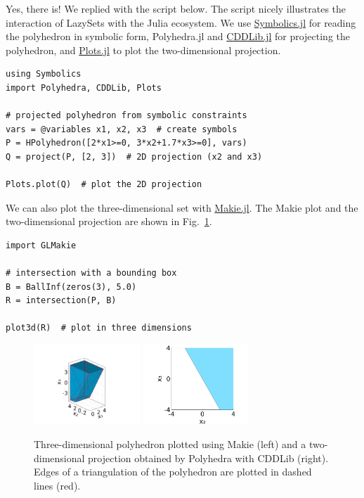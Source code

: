 Yes, there is!
We replied with the script below.
The script nicely illustrates the interaction of LazySets with the Julia ecosystem.
We use \href{https://github.com/JuliaSymbolics/Symbolics.jl}{Symbolics.jl} for reading the polyhedron in symbolic form, Polyhedra.jl and \href{https://github.com/JuliaPolyhedra/CDDLib.jl}{CDDLib.jl} for projecting the polyhedron, and \href{https://github.com/JuliaPlots/Plots.jl}{Plots.jl} to plot the two-dimensional projection.

\begin{minipage}{\linewidth}
\vspace{-\abovedisplayskip}
\begin{lstlisting}
using Symbolics
import Polyhedra, CDDLib, Plots

# projected polyhedron from symbolic constraints
vars = @variables x1, x2, x3  # create symbols
P = HPolyhedron([2*x1>=0, 3*x2+1.7*x3>=0], vars)
Q = project(P, [2, 3])  # 2D projection (x2 and x3)

Plots.plot(Q)  # plot the 2D projection
\end{lstlisting}
\end{minipage}

We can also plot the three-dimensional set with \href{https://github.com/JuliaPlots/Makie.jl}{Makie.jl}.
The Makie plot and the two-dimensional projection are shown in Fig.~\ref{fig:polyhedra}.

\begin{minipage}{\linewidth}
\vspace{-\abovedisplayskip}
\begin{lstlisting}
import GLMakie

# intersection with a bounding box
B = BallInf(zeros(3), 5.0)
R = intersection(P, B)

plot3d(R)  # plot in three dimensions
\end{lstlisting}
\end{minipage}

\begin{figure}
	\centering
	\hfill
	\includegraphics[width=0.49\linewidth, height=3cm, keepaspectratio,clip,trim=40mm 14mm 62mm 35mm]{img/polyhedron3D}
	\hfill
	\includegraphics[width=0.49\linewidth, height=3cm, keepaspectratio]{img/polyhedron2D}
	\hfill\,
	\vspace*{1mm}
	\caption{Three-dimensional polyhedron plotted using Makie (left) and a two-dimensional projection obtained by Polyhedra with CDDLib (right). Edges of a triangulation of the polyhedron are plotted in dashed lines (red).}
	\label{fig:polyhedra}
\end{figure}

